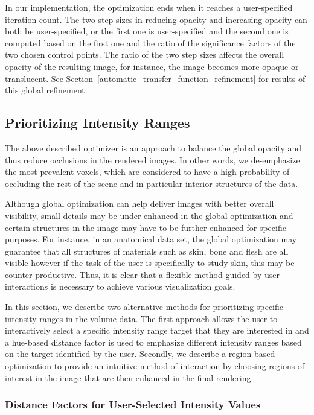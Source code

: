 In our implementation, the optimization ends when it reaches a user-specified iteration count.
The two step sizes in reducing opacity and increasing opacity can both be user-specified, or the first one is user-specified and the second one is computed based on the first one and the ratio of the significance factors of the two chosen control points. The ratio of the two step sizes affects the overall opacity of the resulting image, for instance, the image becomes more opaque or translucent. See Section~\ref{automatic_transfer_function_refinement} for results of this global refinement.

\subsection{Prioritizing Intensity Ranges \label{interaction_methods}}
The above described optimizer is an approach to balance the global opacity and thus reduce occlusions in the rendered images. In other words, we de-emphasize the most prevalent voxels, which are considered to have a high probability of occluding the rest of the scene and in particular interior structures of the data.

Although global optimization can help deliver images with better overall visibility, small details may be under-enhanced in the global optimization and certain structures in the image may have to be further enhanced for specific purposes. For instance, in an anatomical data set, the global optimization may guarantee that all structures of materials such as skin, bone and flesh are all visible however if the task of the user is specifically to study skin, this may be counter-productive. Thus, it is clear that a flexible method guided by user interactions is necessary to achieve various visualization goals. 

In this section, we describe two alternative methods for prioritizing specific intensity ranges in the volume data. The first approach allows the user to interactively select a specific intensity range target that they are interested in and a hue-based distance factor is used to emphasize different intensity ranges based on the target identified by the user. Secondly, we describe a region-based optimization to provide an intuitive method of interaction by choosing regions of interest in the image that are then enhanced in the final rendering.

\subsubsection{Distance Factors for User-Selected Intensity Values}

